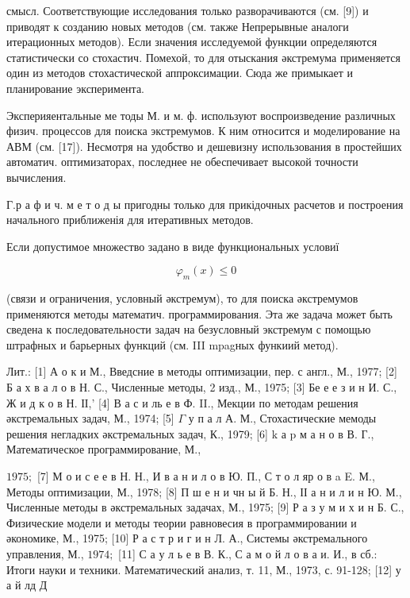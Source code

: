 \documentclass[10pt]{article}
\begin{document}
смысл. Соответствующие исследования только разворачиваются (см. [9]) и приводят к созданию новых методов (см. также Непрерывные аналоги итерационных методов). Если значения исследуемой функции определяются статистически со стохастич. Помехой, то для отыскания әкстремума применяется один из методов стохастической аппроксимации. Сюда же примыкает и планирование эксперимента.



Эксперияентальные ме тоды М. и м. ф. используют воспроизведение различных физич. процессов для поиска экстремумов. К ним относится и моделирование на АВМ (см. [17]). Несмотря на удобство и дешевизну использования в простейших автоматич. оптимизаторах, последнее не обеспечивает высокой точности вычисления.



Г.р а ф и ч. м е т о д ы пригодны только для прикідочных расчетов и построения начального приближенія для итеративных методов.



Если допустимое множество задано в виде функциональных условиї



\[

\varphi_{m}(x) \leqslant 0

\]



(связи и ограничения, условный әкстремум), то для поиска әкстремумов применяются методы математич. программирования. Эта же задача может быть сведена к последовательности задач на безусловный экстремум с помощью штрафных и барьерных функций (см. III mpagных функиий метод).



Лит.: [1] А о к и М., Введсние в методы оптимизации, пер. с англ., М., 1977; [2] Б а х в а л о в Н. С., Численные методы, 2 изд., М., 1975; [3] Бе е е з и н И. С., Ж и д к о в Н. ІІ,' [4] В а с и ль е в Ф. II., Мекции по методам решения әкстремальных задач, М., 1974; [5] $\Gamma$ у п а л А. М., Стохастические мемоды решения негладких әкстремальных задач, К., 1979; [6] $\mathrm{k}$ а $\mathrm{p}$ м а н о в В. Г., Математическое программирование, М.,

$1975 ;$ [7] М о и с е е в Н. Н., И в а н и л о в Ю. П., С т о л яр о в a E. М., Методы оптимизации, М., 1978; [8] П ш е н и чн ы й Б. Н., ІІ а н и л и н Ю. М., Численные методы в әкстремальных задачах, М., 1975; [9] Р а з у м и х и н Б. С., Физические модели и методы теории равновесия в программировании и әкономике, М., 1975; [10] Р а с т р и г и н Л. А., Системы әкстремального управления, М., $1974 ;$ [11] С а у л ь е в В. К., С а м о й л о в а и. И., в сб.: Итоги науки и техники. Математический анализ, т. 11, М., 1973, с. 91-128; [12] у а й лд Д
\end{document}
